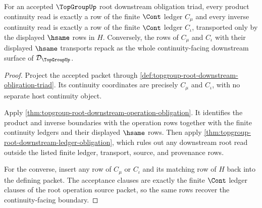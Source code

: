 \begin{theorem}
\label{thm:topgroup-root-downstream-continuity-obligation}
For an accepted $\TopGroupUp$ root downstream obligation triad, every product
continuity read is exactly a row of the finite $\Cont$ ledger $C_{\mu}$ and
every inverse continuity read is exactly a row of the finite $\Cont$ ledger
$C_{\iota}$, transported only by the displayed $\hsame$ rows in $H$.
Conversely, the rows of $C_{\mu}$ and $C_{\iota}$ with their displayed
$\hsame$ transports repack as the whole continuity-facing downstream surface
of $\mathcal{D}_{\TopGroupUp}$.
\end{theorem}
\begin{proof}
Project the accepted packet through
\autoref{def:topgroup-root-downstream-obligation-triad}. Its continuity
coordinates are precisely $C_{\mu}$ and $C_{\iota}$, with no separate host
continuity object.

Apply \autoref{thm:topgroup-root-downstream-operation-obligation}. It identifies
the product and inverse boundaries with the operation rows together with the
finite continuity ledgers and their displayed $\hsame$ rows. Then apply
\autoref{thm:topgroup-root-downstream-ledger-obligation}, which rules out any
downstream root read outside the listed finite ledger, transport, source, and
provenance rows.

For the converse, insert any row of $C_{\mu}$ or $C_{\iota}$ and its matching
row of $H$ back into the defining packet. The acceptance clauses are exactly
the finite $\Cont$ ledger clauses of the root operation source packet, so the
same rows recover the continuity-facing boundary.
\end{proof}

